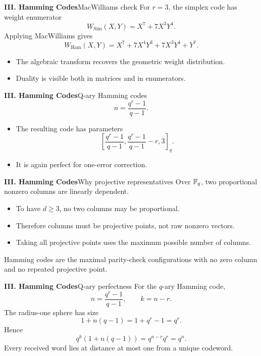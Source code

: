 \begin{frame}{\textbf{III. Hamming Codes}}{MacWilliams check}
\small
For $r=3$, the simplex code has weight enumerator
\[
  W_{\operatorname{Sim}}(X,Y)=X^7+7X^3Y^4.
\]
Applying MacWilliams gives
\[
  W_{\operatorname{Ham}}(X,Y)=X^7+7X^4Y^3+7X^3Y^4+Y^7.
\]
\begin{itemize}
  \item The algebraic transform recovers the geometric weight distribution.
  \item Duality is visible both in matrices and in enumerators.
\end{itemize}
\end{frame}

\begin{frame}{\textbf{III. Hamming Codes}}{Q-ary Hamming codes}
\small
{}
\[
  n=\frac{q^r-1}{q-1}.
\]
\begin{itemize}
  \item The resulting code has parameters
  \[
    \left[\frac{q^r-1}{q-1},\frac{q^r-1}{q-1}-r,3\right]_q.
  \]
  \item It is again perfect for one-error correction.
\end{itemize}
\end{frame}

\begin{frame}{\textbf{III. Hamming Codes}}{Why projective representatives}
\small
Over $\mathbb{F}_q$, two proportional nonzero columns are linearly dependent.
\begin{itemize}
  \item To have $d\ge3$, no two columns may be proportional.
  \item Therefore columns must be projective points, not raw nonzero vectors.
  \item Taking all projective points uses the maximum possible number of columns.
\end{itemize}
Hamming codes are the maximal parity-check configurations with no zero column and no repeated projective point.
\end{frame}

\begin{frame}{\textbf{III. Hamming Codes}}{Q-ary perfectness}
\small
For the $q$-ary Hamming code,
\[
  n=\frac{q^r-1}{q-1},\qquad k=n-r.
\]
The radius-one sphere has size
\[
  1+n(q-1)=1+q^r-1=q^r.
\]
Hence
\[
  q^k(1+n(q-1))=q^{n-r}q^r=q^n.
\]
Every received word lies at distance at most one from a unique codeword.
\end{frame}

